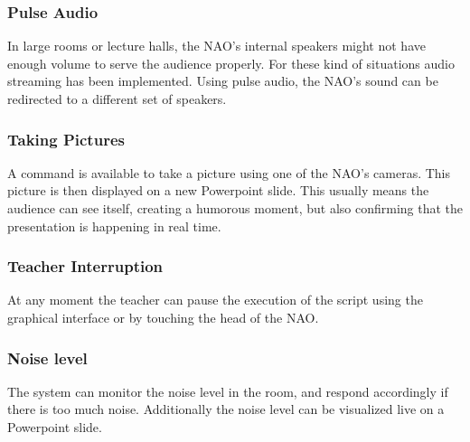\subsubsection{Pulse Audio}
In large rooms or lecture halls, the NAO's internal speakers might not have enough volume to serve the audience properly. For these kind of situations audio streaming has been implemented. Using pulse audio, the NAO's sound can be redirected to a different set of speakers.

\subsubsection{Taking Pictures}
A command is available to take a picture using one of the NAO's cameras. This picture is then displayed on a new Powerpoint slide. This usually means the audience can see itself, creating a humorous moment, but also confirming that the presentation is happening in real time.

\subsubsection{Teacher Interruption}
At any moment the teacher can pause the execution of the script using the graphical interface or by touching the head of the NAO.

\subsubsection{Noise level}
The system can monitor the noise level in the room, and respond accordingly if there is too much noise. Additionally the noise level can be visualized live on a Powerpoint slide.

